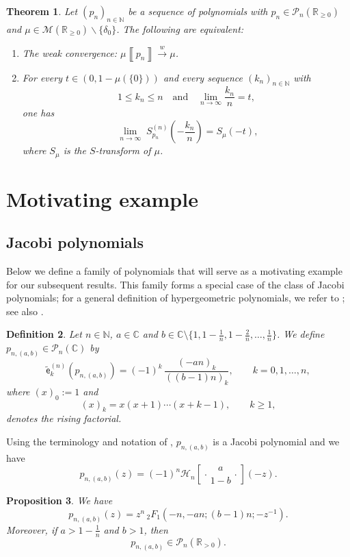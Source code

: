 \documentclass[a4paper,11pt]{amsart}
\numberwithin{equation}{section}
\newtheorem{theorem}{Theorem}[section]
\newtheorem{proposition}[theorem]{Proposition}
\newtheorem{definition}[theorem]{Definition}
\newcommand{\weak}{\xrightarrow{w}}
\newcommand{\C}{\mathbb{C}}
\newcommand{\N}{\mathbb{N}}
\newcommand{\R}{\mathbb{R}}
\newcommand{\pols}{\mathcal P}
\newcommand{\MM}{\mathcal{M}}
\newcommand*\HGP[3]{%
 \mathcal{H}_{#1}{\left[\genfrac..{0pt}{1}{#2}{#3}\right]}%
}
\newcommand{\meas}[1]{\mu\! \left\llbracket #1 \right\rrbracket}
\newcommand{\coef}[2]{\widetilde{\mathsf{e}}_{#1}^{(#2)}} %
\newcommand{\strans}[2]{S_{#1}^{(#2)}}   %
\begin{document}
\begin{theorem}
\label{thm:main} 
Let $(p_n)_{n\in \N}$ be a sequence of polynomials with $p_n\in \pols_n(\R_{\geq 0})$ and $\mu\in \MM(\R_{\geq 0})\backslash \{\delta_0\}$. The following are equivalent:
\begin{enumerate}
\item The weak convergence: $\meas{p_n} \weak \mu$. 
\item For every $t\in (0,1-\mu(\{0\}))$ and every sequence $(k_n)_{n\in\N}$ with 
\[
1\leq k_n \leq n\quad\mbox{and}\quad\lim_{n\to\infty} \frac{k_n}{n}=t,
\]
one has 
\begin{equation}
\label{eq:intro.limit.S}
\lim_{\substack{n\to \infty}}\strans{p_n}{n}\left(-\frac{k_n}{n}\right)= S_\mu(-t),
\end{equation}
where $S_\mu$ is the $S$-transform of $\mu$. 
\end{enumerate}
\end{theorem}


\section{Motivating example}\label{sec:ex}
\subsection{Jacobi polynomials}\label{sec:hyp}

Below we define a family of polynomials that will serve as a motivating example for our subsequent results. This family forms a special case of the class of Jacobi polynomials; for a general definition of hypergeometric polynomials, we refer to \cite{MMP23}; see also \cite{JKM25b}.

\begin{definition}
Let $n\in \N$, $a\in \C$ and $b\in \C\setminus \{1,1-\frac1n,1-\frac2n,\dots,\frac1n\}$.
We define $p_{n,(a,b)}\in \pols_n(\C)$ by
\[
\coef{k}{n}\!\left(p_{n,(a,b)}\right)
= (-1)^k\,\frac{(-an)_k}{((b-1)n)_k},
\qquad k=0,1,\dots,n,
\]
where $(x)_0:=1$ and
\[
(x)_k = x(x+1)\cdots(x+k-1), \qquad k\ge 1,
\]
denotes the rising factorial.
\end{definition}

    Using the terminology and notation of \cite[Section 5.2]{MMP23}, $p_{n,(a,b)}$ is a Jacobi polynomial and we have 
\[
p_{n,(a,b)}(z) = (-1)^n\HGP{n}{a}{1-b}(-z).
\]

\begin{proposition}\label{thm:hypergeom_zeros}
We have
\[
p_{n,(a,b)}(z)
= z^n\,{}_2F_1\!\left(-n,-an;(b-1)n;-z^{-1}\right).
\]
Moreover, if $a>1-\frac1n$ and $b>1$, then
\[
p_{n,(a,b)} \in \pols_n(\R_{>0}).
\]
\end{proposition}
\end{document}
